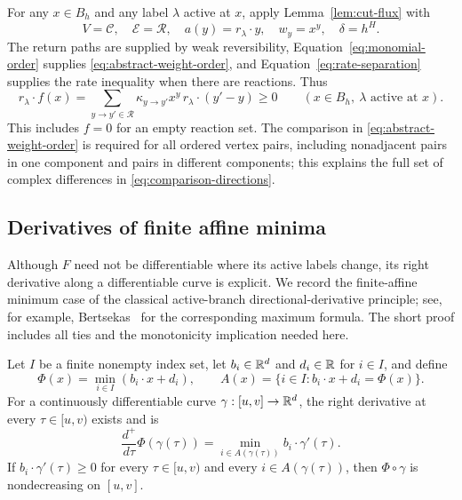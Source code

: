 For any $x\in B_h$ and any label $\lambda$ active at $x$, apply
Lemma~\ref{lem:cut-flux} with
\[
 V=\mathcal C,\quad \mathcal E=\mathcal R,\quad
 a(y)=r_\lambda\cdot y,\quad w_y=x^y,\quad \delta=h^H.
\]
The return paths are supplied by weak reversibility,
Equation~\eqref{eq:monomial-order} supplies
\eqref{eq:abstract-weight-order}, and
Equation~\eqref{eq:rate-separation} supplies the rate inequality when
there are reactions. Thus
\begin{equation}\label{eq:active-nondecrease}
 r_\lambda\cdot f(x)
 =\sum_{y\to y'\in\mathcal R}
   \kappa_{y\to y'}x^y\,r_\lambda\cdot(y'-y)
 \ge0
 \qquad(x\in B_h,\ \lambda\text{ active at }x).
\end{equation}
This includes $f=0$ for an empty reaction set. The comparison in
\eqref{eq:abstract-weight-order} is required for all ordered vertex
pairs, including nonadjacent pairs in one component and pairs in different
components; this explains the full set of complex differences in
\eqref{eq:comparison-directions}.

\subsection{Derivatives of finite affine minima}

Although $F$ need not be differentiable where its active labels change,
its right derivative along a differentiable curve is explicit. We record
the finite-affine minimum case of the classical active-branch
directional-derivative principle; see, for example,
Bertsekas~\cite[Proposition~A.3.2(a)]{Bertsekas2009} for the corresponding
maximum formula. The short proof includes all ties and the monotonicity
implication needed here.

\begin{lemma}
\label{lem:minimum-derivative}
Let $I$ be a finite nonempty index set, let $b_i\in\mathbb R^d$ and
$d_i\in\mathbb R$ for $i\in I$, and define
\[
 \Phi(x)=\min_{i\in I}(b_i\cdot x+d_i),
 \qquad A(x)=\{i\in I:b_i\cdot x+d_i=\Phi(x)\}.
\]
For a continuously differentiable curve
$\gamma:[u,v]\to\mathbb R^d$, the right derivative at every $\tau\in[u,v)$
exists and is
\[
 \frac{d^+}{d\tau}\Phi(\gamma(\tau))
 =\min_{i\in A(\gamma(\tau))} b_i\cdot\gamma'(\tau).
\]
If $b_i\cdot\gamma'(\tau)\ge0$ for every $\tau\in[u,v)$ and every
$i\in A(\gamma(\tau))$, then $\Phi\circ\gamma$ is nondecreasing on
$[u,v]$.
\end{lemma}

